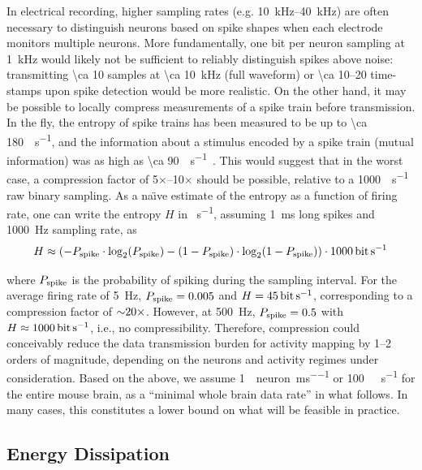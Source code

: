 In electrical recording, higher sampling rates (e.g. \SIrange{10}{40}{\kilo\hertz}) are often necessary to distinguish neurons based on spike shapes when each electrode monitors multiple neurons.
More fundamentally, one bit per neuron sampling at \SI{1}{\kilo\hertz} would likely not be sufficient to reliably distinguish spikes above noise: transmitting \SI{\ca 10}{\bit} samples at \SI{\ca 10}{\kilo\hertz} (full waveform) or \SIrange{\ca 10}{20}{\bit} time-stamps upon spike detection would be more realistic.
On the other hand, it may be possible to locally compress measurements of a spike train before transmission.
In the fly, the entropy of spike trains has been measured to be up to \SI{\ca 180}{\bit\per\second}, and the information about a stimulus encoded by a spike train (mutual information) was as high as \SI{\ca 90}{\bit\per\second}~\cite{strong98}. This would suggest that in the worst case, a compression factor of 5$\times$--10$\times$ should be possible, relative to a \SI{1000}{\bit\per\second} raw binary sampling. As a na\"{\i}ve estimate of the entropy as a function of firing rate, one can write the entropy $H$ in \si{\bit\per\second}, assuming \SI{1}{\milli\second} long spikes and \SI{1000}{\hertz} sampling rate, as
\[H \approx \left(-P\sub{spike}\cdot\log_2\!\left(P\sub{spike}\right) - \left(1 - P\sub{spike}\right)\cdot\log_2\!\left(1 - P\sub{spike}\right)\right) \cdot \SI{1000}{\bit\per\second}\]

where $P_{\text{\scriptsize spike}}$ is the probability of spiking during the sampling interval.
For the average firing rate of \SI{5}{\hertz}, $P_{\text{\scriptsize spike}}=0.005$ and $H=\SI{45}{\bit\per\second}$, corresponding to a compression factor of ${\sim} 20\times$.
However, at \SI{500}{\hertz}, $P_{\text{\scriptsize spike}}=0.5$ with $H\approx\SI{1000}{\bit\per\second}$, i.e., no compressibility. 
Therefore, compression could conceivably reduce the data transmission burden for activity mapping by 1--2 orders of magnitude, depending on the neurons and activity regimes under consideration.
Based on the above, we assume \SI{1}{\bit\per neuron\per\milli\second} or \SI{100}{\giga\bit\per\second} for the entire mouse brain, as a ``minimal whole brain data rate'' in what follows.
In many cases, this constitutes a lower bound on what will be feasible in practice.

\subsection{Energy Dissipation}

